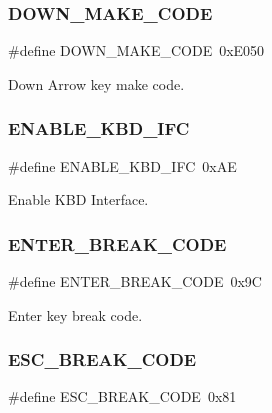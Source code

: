 \subsubsection{\texorpdfstring{D\+O\+W\+N\+\_\+\+M\+A\+K\+E\+\_\+\+C\+O\+DE}{DOWN\_MAKE\_CODE}}
{\footnotesize\ttfamily \#define D\+O\+W\+N\+\_\+\+M\+A\+K\+E\+\_\+\+C\+O\+DE~0x\+E050}



Down Arrow key make code. 

\hypertarget{group__i8042_gae8d4fd793912bd5cd0b06e8f69ffe076}{}\label{group__i8042_gae8d4fd793912bd5cd0b06e8f69ffe076} 
\subsubsection{\texorpdfstring{E\+N\+A\+B\+L\+E\+\_\+\+K\+B\+D\+\_\+\+I\+FC}{ENABLE\_KBD\_IFC}}
{\footnotesize\ttfamily \#define E\+N\+A\+B\+L\+E\+\_\+\+K\+B\+D\+\_\+\+I\+FC~0x\+AE}



Enable K\+BD Interface. 

\hypertarget{group__i8042_ga54db80d887c9139084b1a66243fa3f72}{}\label{group__i8042_ga54db80d887c9139084b1a66243fa3f72} 
\subsubsection{\texorpdfstring{E\+N\+T\+E\+R\+\_\+\+B\+R\+E\+A\+K\+\_\+\+C\+O\+DE}{ENTER\_BREAK\_CODE}}
{\footnotesize\ttfamily \#define E\+N\+T\+E\+R\+\_\+\+B\+R\+E\+A\+K\+\_\+\+C\+O\+DE~0x9C}



Enter key break code. 

\hypertarget{group__i8042_ga592dfdf397b21913348b4dd6b7759b2d}{}\label{group__i8042_ga592dfdf397b21913348b4dd6b7759b2d} 
\subsubsection{\texorpdfstring{E\+S\+C\+\_\+\+B\+R\+E\+A\+K\+\_\+\+C\+O\+DE}{ESC\_BREAK\_CODE}}
{\footnotesize\ttfamily \#define E\+S\+C\+\_\+\+B\+R\+E\+A\+K\+\_\+\+C\+O\+DE~0x81}



